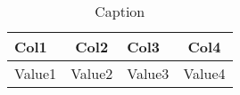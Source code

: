 
\begin{table}[h!] %
            \centering
            \begin{tabular}{|l|c|p{8cm}|c|} %
                \rowcolor{orange!50} %
        		\hline
        		\textbf{Col1} & \textbf{Col2} & \textbf{Col3} & \textbf{Col4}\\
                \hline
                Value1 & Value2 & Value3 & Value4\\
        \end{tabular}
        \caption{Caption} %
        \label{tab:my_label}
\end{table}
